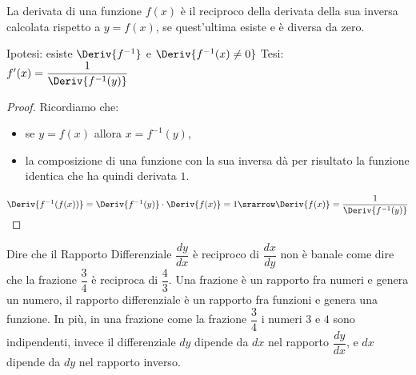 
\begin{teorema}
\label{teo:derinversa}
La derivata di una funzione \(f(x)\) è il reciproco della derivata della sua 
inversa calcolata rispetto a \(y = f(x)\), se quest'ultima esiste e è diversa 
da zero.
\end{teorema}
\noindent Ipotesi: esiste \(\Deriv{f^{-1}}\) e \(\Deriv{f^{-1}(x) \ne 0}\) 
\tab Tesi: \(f'(x)=\dfrac{1}{\Deriv{f^{-1}(y)}}\)
\begin{proof}
Ricordiamo che:
\begin{itemize}
\item se \quad \(y = f(x)\) \quad  allora \quad \(x = f^{-1}(y)\), 
\item la composizione di una funzione con la sua inversa dà per risultato la 
funzione identica che ha quindi derivata \(1\).
\end{itemize}
\hspace{20mm}
\(\Deriv{f^{-1}(f(x))} = \Deriv{f^{-1}(y)} \cdot \Deriv{f(x)} = 1 \srarrow 
  \Deriv{f(x)} = \dfrac{1}{\Deriv{f^{-1}(y)}} \)
\end{proof}
\begin{osservazione}
Dire che il Rapporto Differenziale \(\dfrac{dy}{dx}\) è reciproco di 
\(\dfrac{dx}{dy}\) non è banale come dire che la frazione \(\dfrac{3}{4}\) 
è reciproca di \(\dfrac{4}{3}\).
Una frazione è un rapporto fra numeri e genera un numero, il rapporto 
differenziale è un rapporto fra funzioni e genera una funzione. 
In più, in una frazione come la frazione \(\dfrac{3}{4}\) i numeri \(3\) 
e \(4\) sono indipendenti, invece il differenziale \(dy\) dipende da 
\(dx\) nel rapporto \(\dfrac{dy}{dx}\),  e \(dx\) dipende da \(dy\) nel 
rapporto inverso. 
\end{osservazione}

